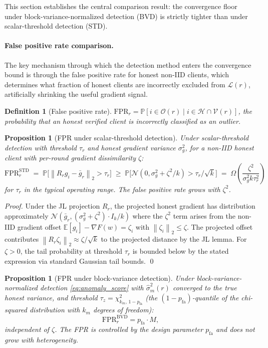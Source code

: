\documentclass{article}
\newtheorem{proposition}[theorem]{Proposition}
\newtheorem{definition}{Definition}
\newcommand{\E}{\mathbb{E}}
\renewcommand{\Pr}{\mathbb{P}}
\newcommand{\norm}[1]{\left\lVert #1 \right\rVert}
\newcommand{\calH}{\mathcal{H}}
\newcommand{\calV}{\mathcal{V}}
\newcommand{\calL}{\mathcal{L}}
\newcommand{\calO}{\mathcal{O}}
\newcommand{\gF}{\nabla F}
\begin{document}
This section establishes the central comparison result:
the convergence floor under block-variance-normalized detection (BVD) is
strictly tighter than under scalar-threshold detection (STD).

\paragraph{False positive rate comparison.}
The key mechanism through which the detection method enters the convergence
bound is through the false positive rate for honest non-IID clients, which
determines what fraction of honest clients are incorrectly excluded from
$\calL(r)$, artificially shrinking the useful gradient signal.

\begin{definition}[False positive rate]
$\mathrm{FPR}_r = \Pr[i \in \calO(r) \mid i \in \calH \cap \calV(r)]$,
the probability that an honest verified client is incorrectly classified
as an outlier.
\end{definition}

\begin{proposition}[FPR under scalar-threshold detection]
\label{prop:fpr_scalar}
Under scalar-threshold detection with threshold $\tau_r$ and honest gradient
variance $\sigma_g^2$, for a non-IID honest client with per-round gradient
dissimilarity $\zeta$:
\[
  \mathrm{FPR}_r^{\mathrm{STD}}
  \;=\;
  \Pr\!\bigl[\norm{R_r g_i - \bar{g}_r}_2 > \tau_r\bigr]
  \;\geq\;
  \Pr\!\bigl[\mathcal{N}(0, \sigma_g^2 + \zeta^2/k) > \tau_r / \sqrt{k}\bigr]
  \;=\;
  \Omega\!\left(\frac{\zeta^2}{\sigma_g^2 k \tau_r^2}\right)
\]
for $\tau_r$ in the typical operating range.
The false positive rate grows with $\zeta^2$.
\end{proposition}

\begin{proof}
Under the JL projection $R_r$, the projected honest gradient has distribution
approximately $\mathcal{N}(\bar{g}_r, (\sigma_g^2 + \zeta^2)\cdot I_k / k)$
where the $\zeta^2$ term arises from the non-IID gradient offset
$\E[g_i] - \gF(w) = \zeta_i$ with $\norm{\zeta_i}_2 \leq \zeta$.
The projected offset contributes $\norm{R_r \zeta_i}_2 \approx \zeta/\sqrt{k}$ to the
projected distance by the JL lemma.
For $\zeta > 0$, the tail probability at threshold $\tau_r$ is bounded below
by the stated expression via standard Gaussian tail bounds.
\qed
\end{proof}

\begin{proposition}[FPR under block-variance detection]
\label{prop:fpr_bvd}
Under block-variance-normalized detection \eqref{eq:anomaly_score} with
$\hat\sigma_m^2(r)$ converged to the true honest variance, and threshold
$\tau_z = \chi^2_{k_m,\,1-p_{\mathrm{fa}}}$ (the $(1-p_{\mathrm{fa}})$-quantile
of the chi-squared distribution with $k_m$ degrees of freedom):
\[
  \mathrm{FPR}_r^{\mathrm{BVD}} = p_{\mathrm{fa}} \cdot M,
\]
independent of $\zeta$.
The FPR is controlled by the design parameter $p_{\mathrm{fa}}$ and does not
grow with heterogeneity.
\end{proposition}
\end{document}
